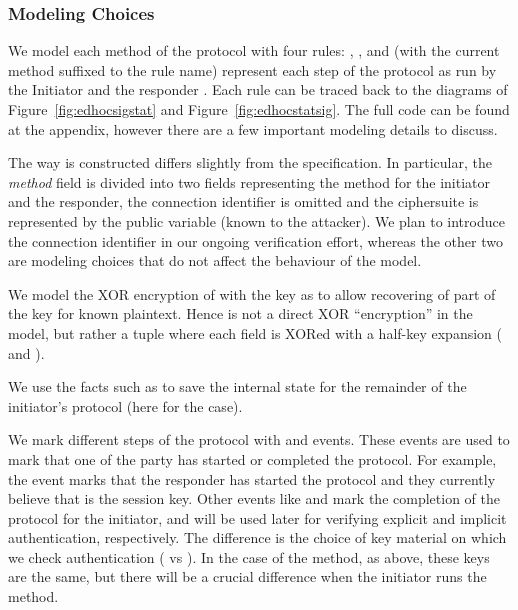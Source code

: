 \subsubsection{Modeling Choices}

We model each method of the protocol with four rules: , , 
and  (with the current method suffixed to the rule name) represent each
step of the protocol as run by the Initiator  and the responder .
Each rule can be traced back to the diagrams of Figure~\ref{fig:edhocsigstat}
and Figure~\ref{fig:edhocstatsig}.
%
The full code can be found at the appendix, however there are a few important
modeling details to discuss.

The way  is constructed differs slightly from the specification. In
particular, the \emph{method} field is divided into two fields representing the
method for the initiator and the responder, the connection identifier is omitted
and the ciphersuite is represented by the public variable
 (known to the attacker). We plan to introduce the connection
identifier \mCi in our ongoing verification effort, whereas the other two are
modeling choices that do not affect the behaviour of the model.

We model the XOR encryption of  with the key  as to
allow recovering of part of the key for known plaintext.
%
Hence  is not a direct XOR ``encryption'' in the model, but
rather a tuple where each field is XORed with a half-key expansion (
and ).

We use the facts such as  %
to save the internal state for the remainder of the initiator's protocol (here
for the \mPskPsk{} case).

We mark different steps of the protocol with  and 
events. These events are used to mark that one of the party has started or
completed the protocol.
%
For example, the event  %
marks that the responder has started the protocol and they currently believe
that  is the session key.
%
Other events like  %
and  mark the completion of the protocol for
the initiator, and will be used later for verifying explicit and implicit
authentication, respectively.  The difference is the choice of key material on
which we check authentication ( vs ). In the case of the
\mSig{} method, as above, these keys are the same, but there will be a crucial
difference when the initiator runs the \mStat{} method.

